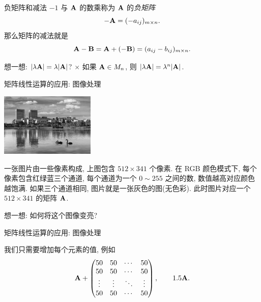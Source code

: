 \begin{frame}{负矩阵和减法}
	\onslide<+->
	$-1$ 与 ${\mathbf{A}}$ 的数乘称为 ${\mathbf{A}}$ 的\emph{负矩阵}
	\[-{\mathbf{A}}=(-a_{ij})_{m\times n}.\]
	\onslide<+->
	那么矩阵的减法就是
	\[{\mathbf{A}}-{\mathbf{B}}={\mathbf{A}}+(-{\mathbf{B}})=(a_{ij}-b_{ij})_{m\times n}.\]
	
	\onslide<+->
	想一想: $|\lambda {\mathbf{A}}|=\lambda |{\mathbf{A}}|$?
	\onslide<+->
	\alert{\Large$\times$}
	如果 ${\mathbf{A}}\in M_n$, 则
	$|\lambda {\mathbf{A}}|=\lambda^n |{\mathbf{A}}|$.
\end{frame}


\begin{frame}{矩阵线性运算的应用: 图像处理}
	\onslide<+->
	\begin{center}
		\includegraphics[height=3cm]{../image/matrix2.jpg}
	\end{center}

	一张图片由一些像素构成, 上图包含 $512\times341$ 个像素.
	\onslide<+->
	在 RGB 颜色模式下, 每个像素包含红绿蓝三个通道, 每个通道为一个 $0\sim255$ 之间的数, 数值越高对应颜色越饱满.
	\onslide<+->
	如果三个通道相同, 图片就是一张灰色的图(无色彩).
	此时图片对应一个 $512\times 341$ 的矩阵 ${\mathbf{A}}$.

	\onslide<+->
	想一想: 如何将这个图像变亮?
\end{frame}


\begin{frame}{矩阵线性运算的应用: 图像处理}
	\onslide<+->
	\begin{center}
	\end{center}
	
	\onslide<+->
	我们只需要增加每个元素的值, 例如
	\[{\mathbf{A}}+\begin{pmatrix}
		50&50&\cdots&50\\
		50&50&\cdots&50\\
		\vdots&\vdots&\ddots&\vdots\\
		50&50&\cdots&50
	\end{pmatrix},\qquad
	1.5{\mathbf{A}}.\]
\end{frame}


